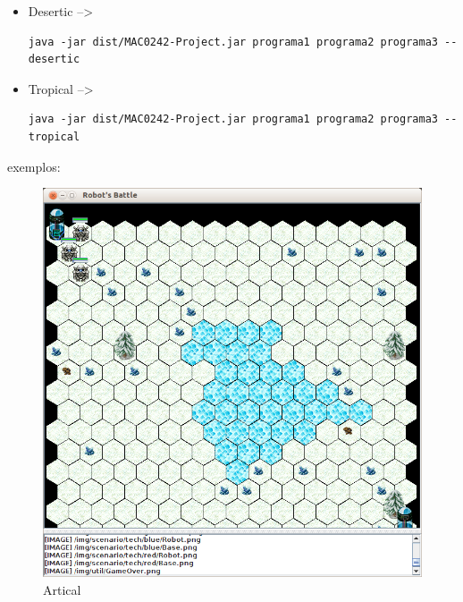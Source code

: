 \documentclass[a4paper]{article}
\begin{document}
{{{{{\begin{itemize}
	\item Desertic --> \begin{verbatim}java -jar dist/MAC0242-Project.jar programa1 programa2 programa3 --desertic\end{verbatim}
	
	\item Tropical --> \begin{verbatim}java -jar dist/MAC0242-Project.jar programa1 programa2 programa3 --tropical\end{verbatim}

\end{itemize}


\newpage %

{\textcolor{NavyBlue}{\LARGE exemplos:}

\bigskip

\begin{figure}[h]
	\centering
    \includegraphics[scale=0.3]{img/artical.png}
    \caption{Artical}
\end{figure}

\bigskip

}}}}}}
\end{document}
